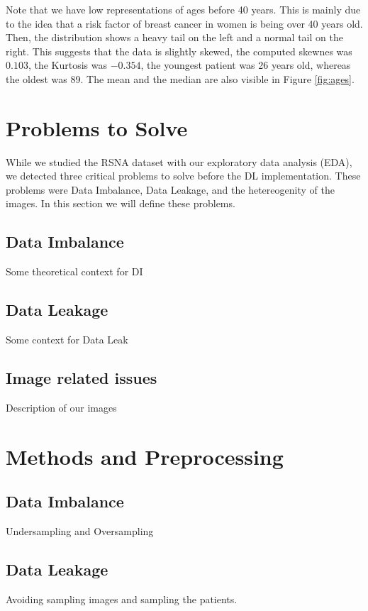 \documentclass[conference]{IEEEtran}
\begin{document}
Note that we have low representations of ages before 40 years. This is mainly due to the idea that a risk factor of breast cancer in women is being over 40 years old. Then, the distribution shows a heavy tail on the left and a normal tail on the right. This suggests that the data is slightly skewed, the computed skewnes was $0.103$, the Kurtosis was $-0.354$, the youngest patient was 26 years old, whereas the oldest was 89. The mean and the median are also visible in Figure \ref{fig:ages}. 

\section{Problems to Solve}

While we studied the RSNA dataset with our exploratory data analysis (EDA), we detected three critical problems to solve before the DL implementation. These problems were Data Imbalance, Data Leakage, and the hetereogenity of the images. In this section we will define these problems. 

\subsection{Data Imbalance}

Some theoretical context for DI
\subsection{Data Leakage}

Some context for Data Leak
\subsection{Image related issues}

Description of our images 
\section{Methods and Preprocessing}

\subsection{Data Imbalance}

Undersampling and Oversampling
\subsection{Data Leakage}

Avoiding sampling images and sampling the patients. 
\end{document}
